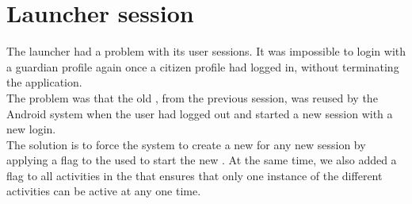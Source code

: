
\section{Launcher session}
\label{sec:launcher_session_issues}

The launcher had a problem with its user sessions. It was impossible to login with a guardian profile again once a citizen profile had logged in, without terminating the application. \\

The problem was that the old , from the previous session, was reused by the Android system when the user had logged out and started a new session with a new login.\\

The solution is to force the system to create a new  for any new session by applying a flag to the  used to start the new . At the same time, we also added a flag to all activities in the \launcher that ensures that only one instance of the different activities can be active at any one time.
